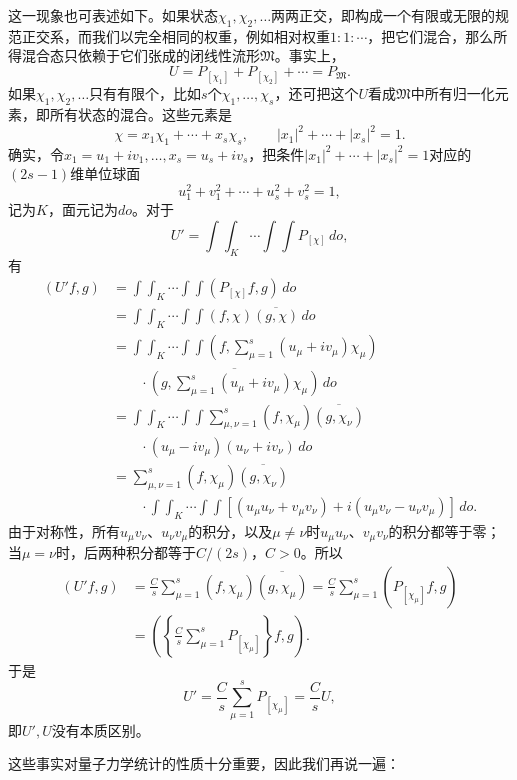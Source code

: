 \documentclass[fontsize=13pt,twoside,openany,headings=normal,parskip=false,bookmarkpackage=false,DIV=calc]{scrbook}
\begin{document}
这一现象也可表述如下。如果状态$\chi_1,\allowbreak \chi_2,\allowbreak \ldots$两两正交，即构成一个有限或无限的规范正交系，而我们以完全相同的\hypertarget{origpage-175}{}\label{origpage-175}权重，例如相对权重$1:1:\cdots$，把它们混合，那么所得混合态只依赖于它们张成的闭线性流形$\mathfrak M$。事实上，
\[
U=P_{[\chi_1]}+P_{[\chi_2]}+\cdots=P_{\mathfrak M}.
\]
如果$\chi_1,\allowbreak \chi_2,\allowbreak \ldots$只有有限个，比如$s$个$\chi_1,\allowbreak \ldots,\allowbreak \chi_s$，还可把这个$U$看成$\mathfrak M$中所有归一化元素，即所有状态的混合。这些元素是
\[
\chi=x_1\chi_1+\cdots+x_s\chi_s,\qquad |x_1|^2+\cdots+|x_s|^2=1.
\]
确实，令$x_1=u_1+iv_1,\allowbreak \ldots,\allowbreak x_s=u_s+iv_s$，把条件$|x_1|^2+\cdots+|x_s|^2=1$对应的$(2s-1)$维单位球面
\[
u_1^2+v_1^2+\cdots+u_s^2+v_s^2=1,
\]
记为$K$，面元记为$do$。对于
\[
U'=\int\!\!\int_K\cdots\int\!\!\int P_{[\chi]}\,do,
\]
有
\begin{align*}
(U'f,g)
&=\int\!\!\int_K\cdots\int\!\!\int(P_{[\chi]}f,g)\,do\\
&=\int\!\!\int_K\cdots\int\!\!\int(f,\chi)\overline{(g,\chi)}\,do\\
&=\int\!\!\int_K\cdots\int\!\!\int
\left(f,\sum_{\mu=1}^s(u_\mu+iv_\mu)\chi_\mu\right)\\
&\qquad{}\cdot\overline{\left(g,\sum_{\mu=1}^s(u_\mu+iv_\mu)\chi_\mu\right)}\,do\\
&=\int\!\!\int_K\cdots\int\!\!\int\sum_{\mu,\nu=1}^s
(f,\chi_\mu)\overline{(g,\chi_\nu)}\\
&\qquad{}\cdot(u_\mu-iv_\mu)(u_\nu+iv_\nu)\,do\\
&=\sum_{\mu,\nu=1}^s(f,\chi_\mu)\overline{(g,\chi_\nu)}\\
&\qquad{}\cdot\int\!\!\int_K\cdots\int\!\!\int
[(u_\mu u_\nu+v_\mu v_\nu)+i(u_\mu v_\nu-u_\nu v_\mu)]\,do.
\end{align*}
由于对称性，所有$u_\mu v_\nu$、$u_\nu v_\mu$的积分，以及$\mu\ne\nu$时$u_\mu u_\nu$、$v_\mu v_\nu$的积分都等于零；当$\mu=\nu$时，后两种积分都等于$C/(2s)$，$C>0$。所以
\begin{align*}
(U'f,g)&=\frac Cs\sum_{\mu=1}^s(f,\chi_\mu)\overline{(g,\chi_\mu)}
=\frac Cs\sum_{\mu=1}^s(P_{[\chi_\mu]}f,g)\\
&=\left(\left\{\frac Cs\sum_{\mu=1}^sP_{[\chi_\mu]}\right\}f,g\right).
\end{align*}
于是
\[
U'=\frac Cs\sum_{\mu=1}^sP_{[\chi_\mu]}=\frac CsU,
\]
即$U',\allowbreak U$没有本质区别。

这些事实对量子力学统计的性质十分重要，因此我们再说一遍：
\end{document}
